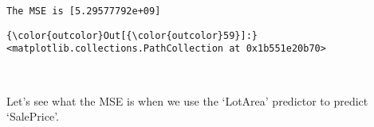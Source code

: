 \documentclass[11pt]{article}
\begin{document}
    \begin{Verbatim}[commandchars=\\\{\}]
The MSE is [5.29577792e+09]

    \end{Verbatim}

\begin{Verbatim}[commandchars=\\\{\}]
{\color{outcolor}Out[{\color{outcolor}59}]:} <matplotlib.collections.PathCollection at 0x1b551e20b70>
\end{Verbatim}
            
    \begin{center}
    \end{center}
    { \hspace*{\fill} \\}
    
    Let's see what the MSE is when we use the `LotArea' predictor to predict
`SalePrice'.
\end{document}
